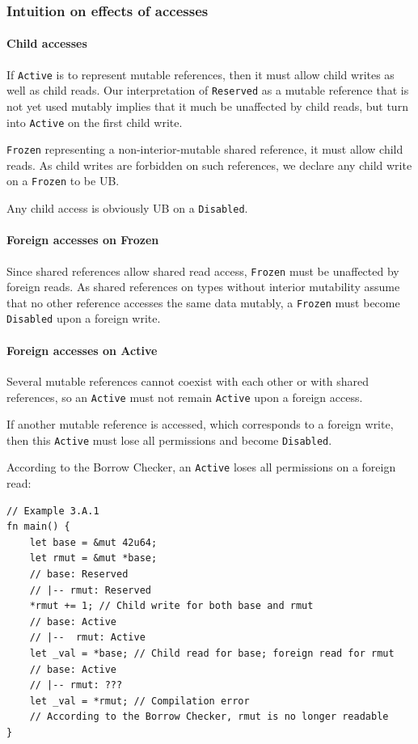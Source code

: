 \documentclass[a4paper,11pt]{article}
\theoremstyle{plain}
\theoremstyle{definition}
\theoremstyle{remark}
\newcommand{\tperm}[1]{\texttt{#1}}
\begin{document}
\subsubsection{Intuition on effects of accesses}

\paragraph*{Child accesses}

If \tperm{Active} is to represent mutable references, then it must allow child writes
as well as child reads. Our interpretation of \tperm{Reserved} as a mutable reference
that is not yet used mutably implies that it much be unaffected by child reads,
but turn into \tperm{Active} on the first child write.

\tperm{Frozen} representing a non-interior-mutable shared reference, it must allow
child reads. As child writes are forbidden on such references, we declare any
child write on a \tperm{Frozen} to be UB.

Any child access is obviously UB on a \tperm{Disabled}.

\paragraph*{Foreign accesses on Frozen}

Since shared references allow shared read access, \tperm{Frozen} must be unaffected
by foreign reads. As shared references on types without interior mutability
assume that no other reference accesses the same data mutably, a \tperm{Frozen} must
become \tperm{Disabled} upon a foreign write.

\paragraph*{Foreign accesses on Active}

Several mutable references cannot coexist with each other or with shared
references, so an \tperm{Active} must not remain \tperm{Active} upon a foreign access.

If another mutable reference is accessed, which corresponds to a foreign write,
then this \tperm{Active} must lose all permissions and become \tperm{Disabled}.

According to the Borrow Checker, an \tperm{Active} loses all permissions on a foreign read:
\begin{lstlisting}
// Example 3.A.1
fn main() {
    let base = &mut 42u64;
    let rmut = &mut *base;
    // base: Reserved
    // |-- rmut: Reserved
    *rmut += 1; // Child write for both base and rmut
    // base: Active
    // |--  rmut: Active
    let _val = *base; // Child read for base; foreign read for rmut
    // base: Active
    // |-- rmut: ???
    let _val = *rmut; // Compilation error
    // According to the Borrow Checker, rmut is no longer readable
}
\end{lstlisting}
\end{document}
